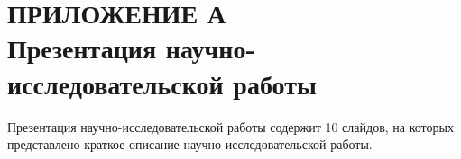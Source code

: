 \chapter*{ПРИЛОЖЕНИЕ А\\Презентация научно-исследовательской работы}
Презентация научно-исследовательской работы содержит 10 слайдов, на которых представлено краткое описание научно-исследовательской работы.